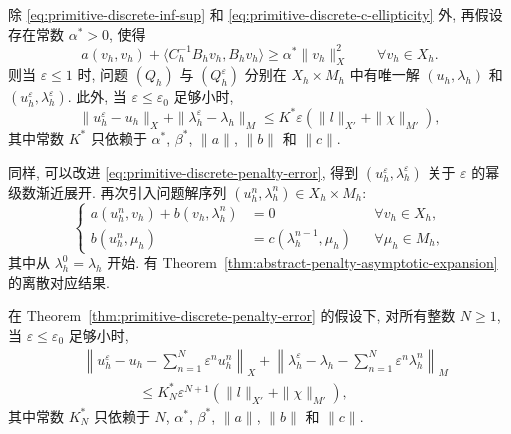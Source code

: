 \setcounter{statement}{2}
\begin{Theorem}\label{thm:primitive-discrete-penalty-error}
除 \eqref{eq:primitive-discrete-inf-sup} 和
\eqref{eq:primitive-discrete-c-ellipticity} 外, 再假设存在常数 $\alpha^*>0$, 使得
\begin{equation}\label{eq:primitive-discrete-combined-ellipticity}
a(v_h,v_h)+\langle C_h^{-1}B_hv_h,B_hv_h\rangle
\geq\alpha^*\|v_h\|_X^2
\qquad\forall v_h\in X_h.
\end{equation}
则当 $\varepsilon\leq1$ 时, 问题 $(Q_h)$ 与 $(Q_h^\varepsilon)$
分别在 $X_h\times M_h$ 中有唯一解 $(u_h,\lambda_h)$ 和
$(u_h^\varepsilon,\lambda_h^\varepsilon)$. 此外, 当
$\varepsilon\leq\varepsilon_0$ 足够小时,
\begin{equation}\label{eq:primitive-discrete-penalty-error}
\|u_h^\varepsilon-u_h\|_X
+\|\lambda_h^\varepsilon-\lambda_h\|_M
\leq K^*\varepsilon(\|l\|_{X'}+\|\chi\|_{M'}),
\end{equation}
其中常数 $K^*$ 只依赖于 $\alpha^*$, $\beta^*$,
$\|a\|$, $\|b\|$ 和 $\|c\|$.
\end{Theorem}

同样, 可以改进 \eqref{eq:primitive-discrete-penalty-error}, 得到
$(u_h^\varepsilon,\lambda_h^\varepsilon)$ 关于 $\varepsilon$ 的幂级数渐近展开.
再次引入问题解序列 $(u_h^n,\lambda_h^n)\in X_h\times M_h$:
\begin{equation}\label{eq:primitive-discrete-penalty-corrections}
\left\{
\begin{aligned}
a(u_h^n,v_h)+b(v_h,\lambda_h^n)&=0
&&\forall v_h\in X_h,\\
b(u_h^n,\mu_h)&=c(\lambda_h^{n-1},\mu_h)
&&\forall\mu_h\in M_h,
\end{aligned}
\right.
\end{equation}
其中从 $\lambda_h^0=\lambda_h$ 开始. 有
Theorem~\ref{thm:abstract-penalty-asymptotic-expansion} 的离散对应结果.

\setcounter{statement}{3}
\begin{Theorem}\label{thm:primitive-discrete-penalty-expansion}
在 Theorem~\ref{thm:primitive-discrete-penalty-error} 的假设下,
对所有整数 $N\geq1$, 当 $\varepsilon\leq\varepsilon_0$ 足够小时,
\begin{equation}\label{eq:primitive-discrete-penalty-expansion}
\begin{split}
&\left\|u_h^\varepsilon-u_h-
\sum_{n=1}^N\varepsilon^nu_h^n\right\|_X
+\left\|\lambda_h^\varepsilon-\lambda_h-
\sum_{n=1}^N\varepsilon^n\lambda_h^n\right\|_M\\
&\hspace{4em}\leq K_N^*\varepsilon^{N+1}
(\|l\|_{X'}+\|\chi\|_{M'}),
\end{split}
\end{equation}
其中常数 $K_N^*$ 只依赖于 $N$, $\alpha^*$, $\beta^*$,
$\|a\|$, $\|b\|$ 和 $\|c\|$.
\end{Theorem}

